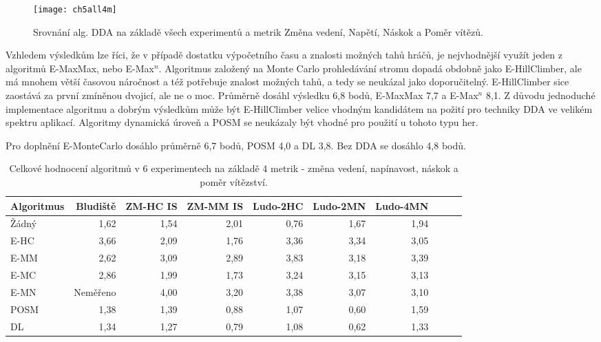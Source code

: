 \begin{figure}
  \centering
  \texttt{[image: ch5all4m]}
	\caption{ Srovnání alg. DDA na základě všech experimentů a metrik Změna vedení, Napětí, Náskok a Poměr vítězů. }
	\label{fig-ch5all4m}
\end{figure}

Vzhledem výsledkům lze říci, že v případě dostatku výpočetního času a znalosti možných tahů hráčů, je nejvhodnější využít jeden z algoritmů E-MaxMax, nebo E-Max$^n$. Algoritmus založený na Monte Carlo prohledávání stromu dopadá obdobně jako E-HillClimber, ale má mnohem větší časovou náročnost a též potřebuje znalost možných tahů, a tedy se neukázal jako doporučitelný. E-HillClimber sice zaostává za první zmíněnou dvojicí, ale ne o moc. Průměrně dosáhl výsledku 6,8 bodů, E-MaxMax 7,7 a E-Max$^n$ 8,1. Z důvodu jednoduché implementace algoritmu a dobrým výsledkům může být E-HillClimber velice vhodným kandidátem na požití pro techniky DDA ve velikém spektru aplikací. Algoritmy dynamická úroveň a POSM se neukázaly být vhodné pro použití u tohoto typu her.

Pro doplnění E-MonteCarlo dosáhlo průměrně 6,7 bodů, POSM 4,0 a DL 3,8. Bez DDA se dosáhlo 4,8 bodů.

\begin{table*}[b]\footnotesize
\vspace*{0mm}
\caption{{\label{tab-all4m}} Celkové hodnocení algoritmů v 6 experimentech na základě 4 metrik - změna vedení, napínavost, náskok a poměr vítězství.}
\vspace*{0mm}
\label{shadowtable}
\begin{center}
\begin{tabular}{| l || r | r | r | r | r | r | r | r | r |}
\hline
Algoritmus & Bludiště & ZM-HC IS & ZM-MM IS & Ludo-2HC & Ludo-2MN & Ludo-4MN \\
\hline
\hline
Žádný & 1,62 & 1,54 & 2,01 & 0,76 & 1,67 & 1,94\\ \hline  
E-HC & 3,66 & 2,09 & 1,76 & 3,36 & 3,34 & 3,05\\ \hline  
E-MM & 2,62 & 3,09 & 2,89 & 3,83 & 3,18 & 3,39\\ \hline  
E-MC & 2,86 & 1,99 & 1,73 & 3,24 & 3,15 & 3,13\\ \hline  
E-MN & Neměřeno & 4,00 & 3,20 & 3,38 & 3,07 & 3,10\\ \hline  
POSM & 1,38 & 1,39 & 0,88 & 1,07 & 0,60 & 1,59\\ \hline  
DL & 1,34 & 1,27 & 0,79 & 1,08 & 0,62 & 1,33 \\ \hline  
\end{tabular}
\end{center}
\end{table*}

\endinput
